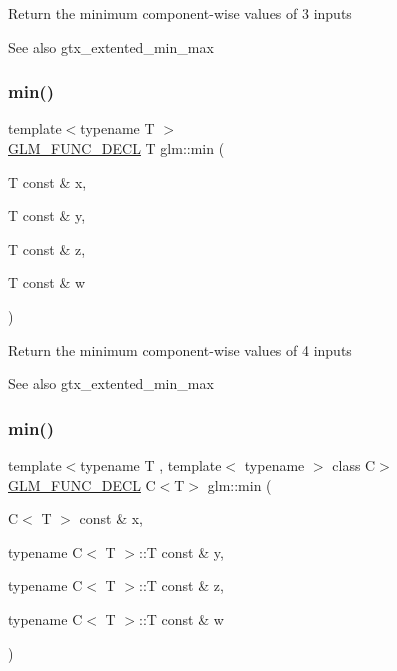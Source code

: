 Return the minimum component-\/wise values of 3 inputs \begin{DoxySeeAlso}{See also}
gtx\+\_\+extented\+\_\+min\+\_\+max 
\end{DoxySeeAlso}
\mbox{\label{group__gtx__extended__min__max_ga95466987024d03039607f09e69813d69}} 
\subsubsection{\texorpdfstring{min()}{min()}\hspace{0.1cm}{\footnotesize\ttfamily [4/6]}}
{\footnotesize\ttfamily template$<$typename T $>$ \\
\hyperlink{setup_8hpp_ab2d052de21a70539923e9bcbf6e83a51}{G\+L\+M\+\_\+\+F\+U\+N\+C\+\_\+\+D\+E\+CL} T glm\+::min (\begin{DoxyParamCaption}\item[{T const \&}]{x,  }\item[{T const \&}]{y,  }\item[{T const \&}]{z,  }\item[{T const \&}]{w }\end{DoxyParamCaption})}

Return the minimum component-\/wise values of 4 inputs \begin{DoxySeeAlso}{See also}
gtx\+\_\+extented\+\_\+min\+\_\+max 
\end{DoxySeeAlso}
\mbox{\label{group__gtx__extended__min__max_ga4fe35dd31dd0c45693c9b60b830b8d47}} 
\subsubsection{\texorpdfstring{min()}{min()}\hspace{0.1cm}{\footnotesize\ttfamily [5/6]}}
{\footnotesize\ttfamily template$<$typename T , template$<$ typename $>$ class C$>$ \\
\hyperlink{setup_8hpp_ab2d052de21a70539923e9bcbf6e83a51}{G\+L\+M\+\_\+\+F\+U\+N\+C\+\_\+\+D\+E\+CL} C$<$T$>$ glm\+::min (\begin{DoxyParamCaption}\item[{C$<$ T $>$ const \&}]{x,  }\item[{typename C$<$ T $>$\+::T const \&}]{y,  }\item[{typename C$<$ T $>$\+::T const \&}]{z,  }\item[{typename C$<$ T $>$\+::T const \&}]{w }\end{DoxyParamCaption})}

